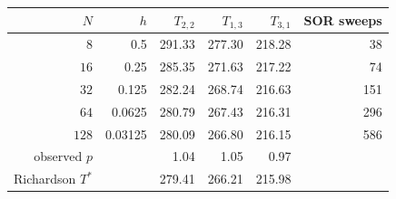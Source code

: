 \begin{tabular}{@{}r r rrr r@{}}
\toprule
$N$ & $h$ & $T_{2,2}$ & $T_{1,3}$ & $T_{3,1}$ & SOR sweeps \\
\midrule
$8$ & 0.5 & 291.33 & 277.30 & 218.28 & 38 \\
$16$ & 0.25 & 285.35 & 271.63 & 217.22 & 74 \\
$32$ & 0.125 & 282.24 & 268.74 & 216.63 & 151 \\
$64$ & 0.0625 & 280.79 & 267.43 & 216.31 & 296 \\
$128$ & 0.03125 & 280.09 & 266.80 & 216.15 & 586 \\
\midrule
observed $p$ & & 1.04 & 1.05 & 0.97 & \\
Richardson $T^*$ & & 279.41 & 266.21 & 215.98 & \\
\bottomrule
\end{tabular}
